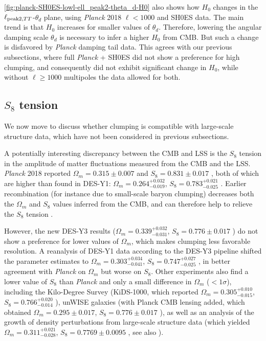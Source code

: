 \cref{fig:planck-SH0ES-lowl-ell_peak2-theta_d-H0} also shows how $H_0$ changes in the $\ell_{{\rm peak2},TT}$-$\theta_d$ plane, using {\it Planck} 2018 $\ell<1000$ and SH0ES data. 
The main trend is that $H_0$ increases for smaller values of $\theta_d$.
Therefore, lowering the angular damping scale $\theta_d$ is necessary to infer a higher $H_0$ from CMB.
But such a change is disfavored by {\it Planck} damping tail data.
This agrees with our previous subsections, where full {\it Planck} + SH0ES did not show a preference for high clumping, and consequently did not exhibit significant change in $H_0$, while without $\ell\ge 1000$ multipoles the data allowed for both.

\subsection{\texorpdfstring{$S_8$}{S8} tension}

We now move to discuss whether clumping is compatible with large-scale structure data, which have not been considered in previous subsections.

A potentially interesting discrepancy between the CMB and LSS is the $S_8$ tension in the amplitude of matter fluctuations measured from the CMB and the LSS.
{\it Planck} 2018 reported $\Omega_m=0.315\pm 0.007$ and $S_8=0.831\pm 0.017$ \citep{Planck2018-cosmo}, both of which are higher than found in DES-Y1: $\Omega_m=0.264^{+0.032}_{-0.019}$, $S_8=0.783^{+0.021}_{-0.025}$ \citep{DES-Y1}.
Earlier recombination (for instance due to small-scale baryon clumping) decreases both the $\Omega_m$ and $S_8$ values inferred from the CMB, and can therefore help to relieve the $S_8$ tension \citep{JP20}.

However, the new DES-Y3 results ($\Omega_m=0.339^{+0.032}_{-0.031}$, $S_8=0.776\pm0.017$ \citep{DES-Y3}) do not show a preference for lower values of $\Omega_m$, which makes clumping less favorable resolution.
A reanalysis of DES-Y1 data according to the DES-Y3 pipeline shifted the parameter estimates to $\Omega_m=0.303^{+0.034}_{-0.041}$, $S_8=0.747^{+0.027}_{-0.025}$ \citep{DES-Y3}, in better agreement with {\it Planck} on $\Omega_m$ but worse on $S_8$.
Other experiments also find a lower value of $S_8$ than {\it Planck} and only a small difference in $\Omega_m$ ($<1\sigma$),
including the
Kilo-Degree Survey (KiDS-1000, which reported $\Omega_m=0.305^{+0.010}_{-0.015}$, $S_8=0.766^{+0.020}_{-0.014}$ \citep{KiDS-1000}), 
unWISE galaxies (with Planck CMB lensing added, which obtained $\Omega_m=0.295\pm 0.017$, $S_8=0.776\pm 0.017$ \citep{unWISE-plancklensing}),
as well as an analysis of the growth of density perturbations from large-scale structure data (which yielded $\Omega_m=0.311^{+0.021}_{-0.028}$, $S_8=0.7769\pm 0.0095$ \citep{dens-perturb-growth}, see also \citep{sdss-boss-eft1,sdss-boss-eft2}).

